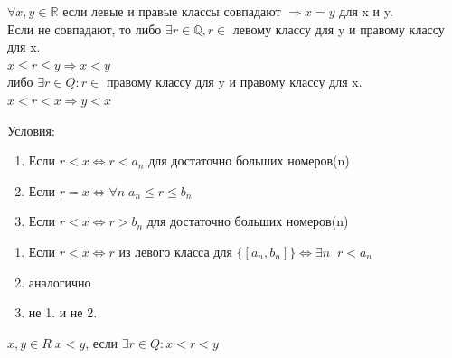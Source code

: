 \documentclass[12pt, paper]{article}
\newcommand{\Q}{\mathbb{Q}}
\newcommand{\R}{\mathbb{R}}
\begin{document}
$\forall x, y \in \R$ если левые и правые классы совпадают $\Rightarrow x=y$ для x и y.\\
Если не совпадают, то либо $\exists r \in \Q, r \in $ левому классу для y и правому классу для x.\\
$x \leq r \leq y \Rightarrow x < y$\\
либо $\exists r \in Q: r \in $ правому классу для y и правому классу для x.\\
$x < r < x \Rightarrow y < x$

\begin{tcolorbox}
    Условия:
    \begin{enumerate}
        \item Если $r < x \Leftrightarrow r < a_n$ для достаточно больших номеров(n)
        \item Если $r = x \Leftrightarrow \forall n\; a_n \leq r \leq b_n$
        \item Если $r < x \Leftrightarrow r > b_n $ для достаточно больших номеров(n)
    \end{enumerate}    
\end{tcolorbox}


\begin{tcolorbox}[title=Доказательство 2., breakable]
\begin{enumerate}
    \item Если $r < x \Leftrightarrow r $ из левого класса для $\{ [a_n,b_n] \} \Leftrightarrow \exists n \;\; r < a_n$
    \item аналогично 
    \item не 1. и не 2.
\end{enumerate}
\end{tcolorbox}

\begin{tcolorbox}
    $x, y \in R\; x < y$, если $\exists r \in Q: x < r < y$
\end{tcolorbox}
\end{document}
